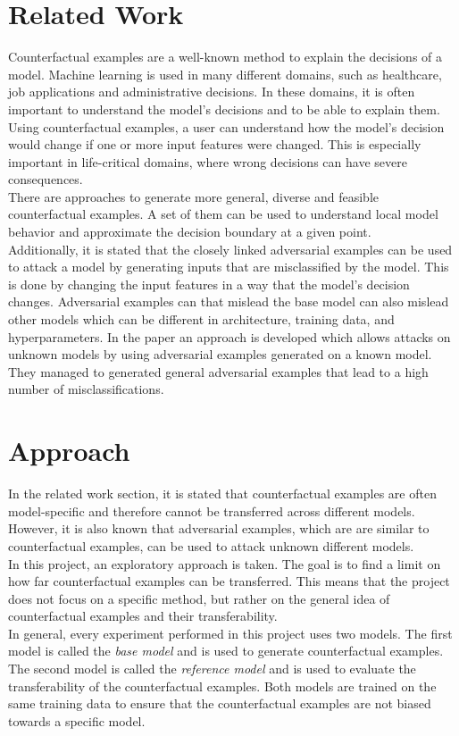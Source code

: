 \documentclass{article}
\begin{document}
\section{Related Work}
Counterfactual examples are a well-known method to explain the decisions of a model. Machine learning is used in many different domains, such as healthcare, job applications and administrative decisions. In these domains, it is often important to understand the model's decisions and to be able to explain them. Using counterfactual examples, a user can understand how the model's decision would change if one or more input features were changed. This is especially important in life-critical domains, where wrong decisions can have severe consequences. \cite{examples_cf_applications}\\
There are approaches to generate more general, diverse and feasible counterfactual examples. A set of them can be used to understand local model behavior and approximate the decision boundary at a given point.\cite{examples_cf_applications} \\
Additionally, it is stated that the closely linked adversarial examples can be used to attack a model by generating inputs that are misclassified by the model. This is done by changing the input features in a way that the model's decision changes. Adversarial examples can that mislead the base model can also mislead other models which can be different in architecture, training data, and hyperparameters. In the paper \cite{papernot2016transferabilitymachinelearningphenomena} an approach is developed which allows attacks on unknown models by using adversarial examples generated on a known model. They managed to generated general adversarial examples that lead to a high number of misclassifications. \cite{papernot2016transferabilitymachinelearningphenomena} \\


\section{Approach}
In the related work section, it is stated that counterfactual examples are often model-specific and therefore cannot be transferred across different models. However, it is also known that adversarial examples, which are are similar to counterfactual examples, can be used to attack unknown different models.\\
In this project, an exploratory approach is taken. The goal is to find a limit on how far counterfactual examples can be transferred. This means that the project does not focus on a specific method, but rather on the general idea of counterfactual examples and their transferability. \\
In general, every experiment performed in this project uses two models. The first model is called the \textit{base model} and is used to generate counterfactual examples. The second model is called the \textit{reference model} and is used to evaluate the transferability of the counterfactual examples. Both models are trained on the same training data to ensure that the counterfactual examples are not biased towards a specific model.\\
\end{document}
